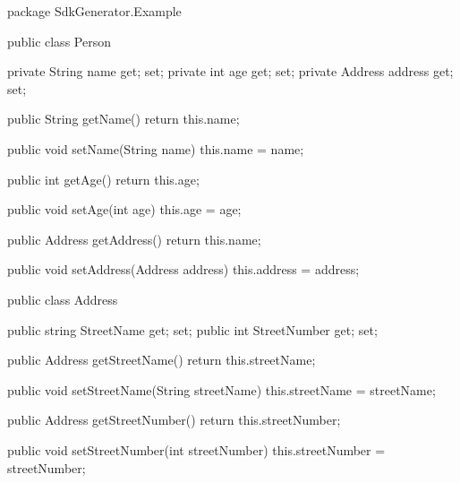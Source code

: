 \begin{java}
package SdkGenerator.Example

public class Person {
    private String name {get; set;}
    private int age {get; set;}
    private Address address {get; set;}

    public String getName() {
      return this.name;
    }

    public void setName(String name) {
      this.name = name;
    }

   public int getAge() {
      return this.age;
    }
    
    public void setAge(int age) {
      this.age = age;
    }
    
    public Address getAddress() {
      return this.name;
    }
    
    public void setAddress(Address address) {
      this.address = address;
    }
}

public class Address {
    public string StreetName {get; set;}
    public int StreetNumber {get; set;}
    
    public Address getStreetName() {
      return this.streetName;
    }
    
    public void setStreetName(String streetName) {
      this.streetName = streetName;
    }
    
    public Address getStreetNumber() {
      return this.streetNumber;
    }
    
    public void setStreetNumber(int streetNumber) {
      this.streetNumber = streetNumber;
    }
}  
\end{java}
